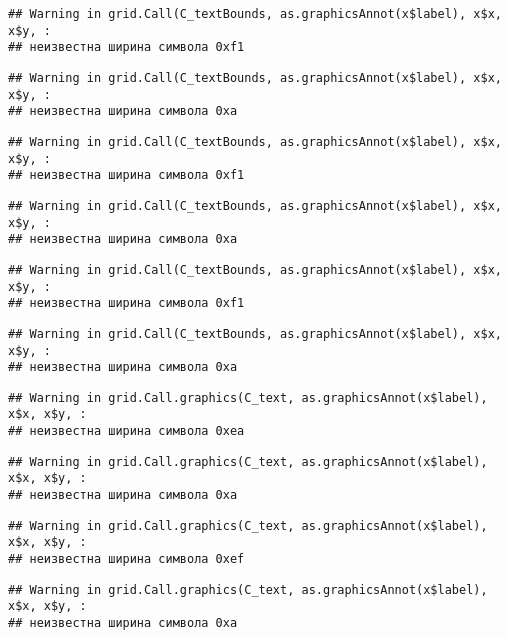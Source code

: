 \documentclass[
]{article}
\begin{document}
\begin{verbatim}
## Warning in grid.Call(C_textBounds, as.graphicsAnnot(x$label), x$x, x$y, :
## неизвестна ширина символа 0xf1
\end{verbatim}

\begin{verbatim}
## Warning in grid.Call(C_textBounds, as.graphicsAnnot(x$label), x$x, x$y, :
## неизвестна ширина символа 0xa
\end{verbatim}

\begin{verbatim}
## Warning in grid.Call(C_textBounds, as.graphicsAnnot(x$label), x$x, x$y, :
## неизвестна ширина символа 0xf1
\end{verbatim}

\begin{verbatim}
## Warning in grid.Call(C_textBounds, as.graphicsAnnot(x$label), x$x, x$y, :
## неизвестна ширина символа 0xa
\end{verbatim}

\begin{verbatim}
## Warning in grid.Call(C_textBounds, as.graphicsAnnot(x$label), x$x, x$y, :
## неизвестна ширина символа 0xf1
\end{verbatim}

\begin{verbatim}
## Warning in grid.Call(C_textBounds, as.graphicsAnnot(x$label), x$x, x$y, :
## неизвестна ширина символа 0xa
\end{verbatim}

\begin{verbatim}
## Warning in grid.Call.graphics(C_text, as.graphicsAnnot(x$label), x$x, x$y, :
## неизвестна ширина символа 0xea
\end{verbatim}

\begin{verbatim}
## Warning in grid.Call.graphics(C_text, as.graphicsAnnot(x$label), x$x, x$y, :
## неизвестна ширина символа 0xa
\end{verbatim}

\begin{verbatim}
## Warning in grid.Call.graphics(C_text, as.graphicsAnnot(x$label), x$x, x$y, :
## неизвестна ширина символа 0xef
\end{verbatim}

\begin{verbatim}
## Warning in grid.Call.graphics(C_text, as.graphicsAnnot(x$label), x$x, x$y, :
## неизвестна ширина символа 0xa
\end{verbatim}
\end{document}
